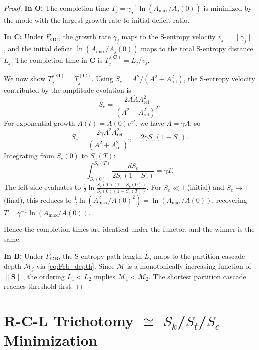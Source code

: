 \documentclass[twocolumn,10pt]{article}
\theoremstyle{remark}
\newcommand{\Depth}{\mathcal{M}}
\newcommand{\Se}{S_e}
\newcommand{\Scoord}{\mathbf{S}}
\newcommand{\CatO}{\mathbf{O}}
\newcommand{\CatC}{\mathbf{C}}
\newcommand{\CatB}{\mathbf{B}}
\newcommand{\Foc}{F_{\CatO\CatC}}
\newcommand{\Fcb}{F_{\CatC\CatB}}
\begin{document}
\begin{proof}
\textbf{In $\CatO$:}
The completion time $T_j = \gamma_j^{-1}\ln(A_{\max}/A_j(0))$ is minimized by the mode with the largest growth-rate-to-initial-deficit ratio.

\textbf{In $\CatC$:}
Under $\Foc$, the growth rate $\gamma_j$ maps to the S-entropy velocity $v_j = \|\dot{\gamma}_j\|$, and the initial deficit $\ln(A_{\max}/A_j(0))$ maps to the total S-entropy distance $L_j$.
The completion time in $\CatC$ is $T_j^{(\CatC)} = L_j / v_j$.

We now show $T_j^{(\CatO)} = T_j^{(\CatC)}$.
Using $\Se = A^2/(A^2 + A_{\mathrm{ref}}^2)$, the S-entropy velocity contributed by the amplitude evolution is
\begin{equation}
\dot{\Se} = \frac{2A\dot{A}A_{\mathrm{ref}}^2}{(A^2 + A_{\mathrm{ref}}^2)^2}.
\end{equation}
For exponential growth $A(t) = A(0)e^{\gamma t}$, we have $\dot{A} = \gamma A$, so
\begin{equation}
\dot{\Se} = \frac{2\gamma A^2 A_{\mathrm{ref}}^2}{(A^2+A_{\mathrm{ref}}^2)^2} = 2\gamma \Se(1-\Se).
\end{equation}
Integrating from $\Se(0)$ to $\Se(T)$:
\begin{equation}
\int_{\Se(0)}^{\Se(T)}\frac{d\Se}{2\Se(1-\Se)} = \gamma T.
\end{equation}
The left side evaluates to $\frac{1}{2}\ln\frac{\Se(T)(1-\Se(0))}{\Se(0)(1-\Se(T))}$.
For $\Se \ll 1$ (initial) and $\Se \to 1$ (final), this reduces to $\frac{1}{2}\ln(A_{\max}^2/A(0)^2) = \ln(A_{\max}/A(0))$, recovering $T = \gamma^{-1}\ln(A_{\max}/A(0))$.

Hence the completion times are identical under the functor, and the winner is the same.

\textbf{In $\CatB$:}
Under $\Fcb$, the S-entropy path length $L_j$ maps to the partition cascade depth $\Depth_j$ via \eqref{eq:Fcb_depth}.
Since $\Depth$ is a monotonically increasing function of $\|\Scoord\|$, the ordering $L_1 < L_2$ implies $\Depth_1 < \Depth_2$.
The shortest partition cascade reaches threshold first.
\end{proof}

\section{\texorpdfstring{R-C-L Trichotomy $\cong$ $S_k$/$S_t$/$S_e$ Minimization}{R-C-L Trichotomy = Sk/St/Se Minimization}}
\label{sec:rcl}
\end{document}
